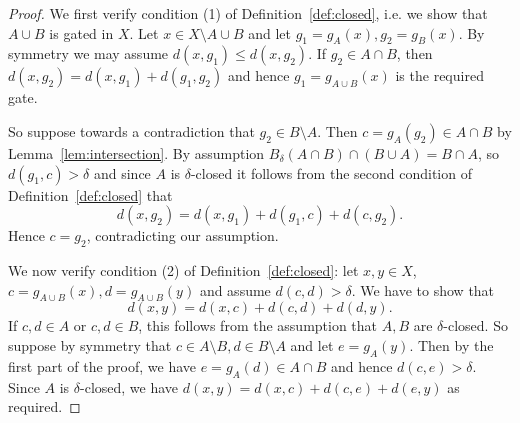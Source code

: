 \documentclass{amsart}
\renewcommand{\d}{\delta}
\begin{document}
\begin{proof}
We first verify condition (1) of Definition~\ref{def:closed}, i.e. we show that $A\cup B$ is gated in $X$. Let $x\in X\setminus A\cup B$ and let $g_1=g_A(x), g_2=g_B(x)$.
 By symmetry we may assume $d(x,g_1)\leq d(x,g_2)$. 
If $g_2\in A\cap B$, then $d(x,g_2)=d(x,g_1)+d(g_1,g_2)$ and hence $g_1=g_{A\cup B}(x)$ is the required gate.

 So suppose towards a contradiction that $g_2\in B\setminus A$. Then $c=g_A(g_2)\in A\cap B$ by Lemma~\ref{lem:intersection}. By assumption $B_\d(A\cap B)\cap (B\cup A)=B\cap A$, so $d(g_1,c)>\d$ and since $A$ is $\d$-closed it follows from the second condition of Definition~\ref{def:closed} that
\[d(x,g_2)=d(x,g_1)+d(g_1,c)+d(c,g_2).\]
Hence $c=g_2$, contradicting our assumption. 




We now verify condition (2) of Definition~\ref{def:closed}: let $x,y\in X$, $c=g_{A\cup B}(x),d=g_{A\cup B}(y)$ and assume $d(c,d)>\delta$. We have to show that 
\[d(x,y)=d(x,c)+d(c,d)+d(d,y).\]
 If $c,d\in A$ or $c,d\in B$, this follows from the assumption that $A, B$ are $\d$-closed.
 So suppose by symmetry that $c\in A\setminus B, d\in B\setminus A$ and let $e=g_A(y)$. Then by the first part of the proof, we have $e=g_A(d)\in A\cap B$ and hence $d(c,e)>\d$. Since $A$ is $\d$-closed, we have
$d(x,y)=d(x,c)+d(c,e)+d(e,y)$ as required.
\end{proof}
\end{document}

